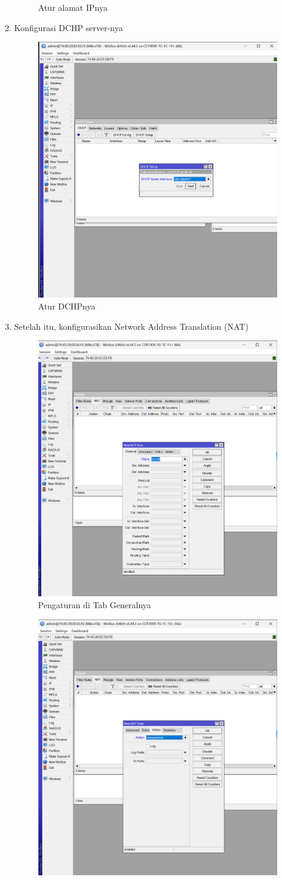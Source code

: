\begin{enumerate}
\begin{figure}[H]
        \caption{Atur alamat IPnya}
        \label{fig:gambar4}
    \end{figure}
    \item Konfigurasi DCHP server-nya
     \begin{figure}[H]
        \centering
        \includegraphics[width=0.5\linewidth]{P1/img/6.png}
        \caption{Atur DCHPnya}
        \label{fig:gambar4}
    \end{figure}
    \item Setelah itu, konfigurasikan Network Address Translation (NAT)
     \begin{figure}[H]
        \centering
        \includegraphics[width=0.5\linewidth]{P1/img/8.png}
        \caption{Pengaturan di Tab Generalnya}
        \label{fig:gambar4}
    \end{figure}
    \begin{figure}[H]
        \centering
        \includegraphics[width=0.5\linewidth]{P1/img/9.png}

\end{figure}
\end{enumerate}
